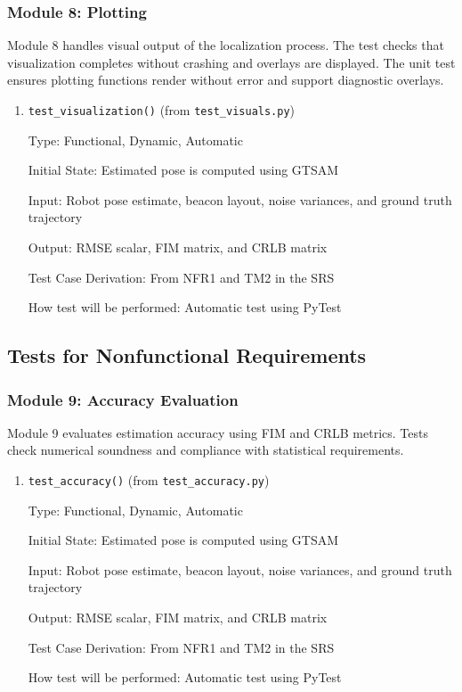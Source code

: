 \documentclass[12pt, titlepage]{article}
\begin{document}
\subsubsection{Module 8: Plotting}
Module 8 handles visual output of the localization process. The test checks that visualization completes without crashing and overlays are displayed. The unit test ensures plotting functions render without error and support diagnostic overlays.

\begin{enumerate}
  \item {\texttt{test\_visualization()} (from \texttt{test\_visuals.py})}
  
  Type: Functional, Dynamic, Automatic
            
  Initial State: Estimated pose is computed using GTSAM
            
  Input: Robot pose estimate, beacon layout, noise variances, and ground truth trajectory
            
  Output: RMSE scalar, FIM matrix, and CRLB matrix
  
  Test Case Derivation: From NFR1 and TM2 in the SRS
  
  How test will be performed: Automatic test using PyTest
\end{enumerate}



\subsection{Tests for Nonfunctional Requirements}



\subsubsection{Module 9: Accuracy Evaluation}
Module 9 evaluates estimation accuracy using FIM and CRLB metrics. Tests check numerical soundness and compliance with statistical requirements.

\begin{enumerate}
  \item {\texttt{test\_accuracy()} (from \texttt{test\_accuracy.py})}
  
  Type: Functional, Dynamic, Automatic
            
  Initial State: Estimated pose is computed using GTSAM
            
  Input: Robot pose estimate, beacon layout, noise variances, and ground truth trajectory
            
  Output: RMSE scalar, FIM matrix, and CRLB matrix
  
  Test Case Derivation: From NFR1 and TM2 in the SRS
  
  How test will be performed: Automatic test using PyTest
\end{enumerate}
\end{document}
